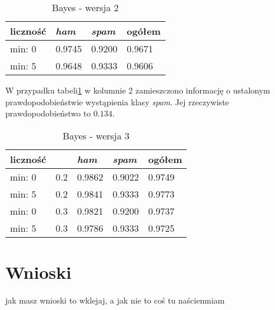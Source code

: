 \documentclass[a4paper,12pt]{article}
\begin{document}
\begin{table}
\centering
\begin{tabular}{|l||p{2.5cm}|p{2.5cm}||p{2.5cm}|}
\hline
liczność & \textit{ham} & \textit{spam} & ogółem \\ 
\hline

min: $0$ & 0.9745 & 0.9200 & 0.9671 \\ \hline
min: $5$ & 0.9648 & 0.9333 & 0.9606 \\ \hline

\end{tabular}
\caption{Bayes - wersja 2}
\end{table}

W przypadku tabeli\ref{bayes:tab3} w kolumnie 2 zamieszczono informację o ustalonym prawdopodobieństwie
wystąpienia klasy \textit{spam}. Jej rzeczywiste prawdopodobieństwo to $0.134$.

\begin{table}
\centering
\begin{tabular}{|l|l||p{2.5cm}|p{2.5cm}||p{2.5cm}|}
\hline
liczność &  & \textit{ham} & \textit{spam} & ogółem \\ 
\hline

min: $0$ & 0.2 & 0.9862 & 0.9022 & 0.9749 \\ \hline
min: $5$ & 0.2 & 0.9841 & 0.9333 & 0.9773 \\ \hline
min: $0$ & 0.3 & 0.9821 & 0.9200 & 0.9737 \\ \hline
min: $5$ & 0.3 & 0.9786 & 0.9333 & 0.9725 \\ \hline

\end{tabular}
\caption{Bayes - wersja 3}
\label{bayes:tab3}
\end{table}

\section{Wnioski}

jak masz wnioski to wklejaj, a jak nie to coś tu naściemniam
\end{document}
